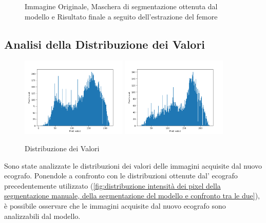 \begin{figure}[!ht]
\begin{minipage}{0.32\textwidth}
	\end{minipage}
	\caption{Immagine Originale, Maschera di segmentazione ottenuta dal modello e Risultato finale a seguito dell'estrazione del femore}
\end{figure}

\subsection{Analisi della Distribuzione dei Valori}
\label{subsec:analisi_distribuzione_valori}

\begin{figure}[!ht]
	\centering
	\includegraphics[width=0.45\textwidth]{./Immagini/nuovo_ecografo_results/hist_0_distribution_value.csv.png}
	\includegraphics[width=0.45\textwidth]{./Immagini/nuovo_ecografo_results/hist_3_distribution_value.csv.png}
	\caption{Distribuzione dei Valori}
	\label{fig:distribuzione_valori}
\end{figure}

Sono state analizzate le distribuzioni dei valori delle immagini acquisite dal
nuovo ecografo. Ponendole a confronto con le distribuzioni ottenute dal'
ecografo precedentemente utilizzato (\autoref{fig:distribuzione intensità dei
	pixel della segmentazione manuale, della segmentazione del modello e confronto
	tra le due}), è possibile osservare che le immagini acquisite dal nuovo ecografo sono analizzabili
dal modello.

